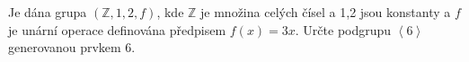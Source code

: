 Je dána grupa $\left ( \mathbb{Z},1,2,f \right )$, kde $\mathbb{Z}$ je množina
celých čísel a 1,2 jsou konstanty a $f$ je unární operace definována předpisem
$f(x)=3x$. Určte podgrupu $\left \langle 6 \right \rangle$ generovanou prvkem 6.
